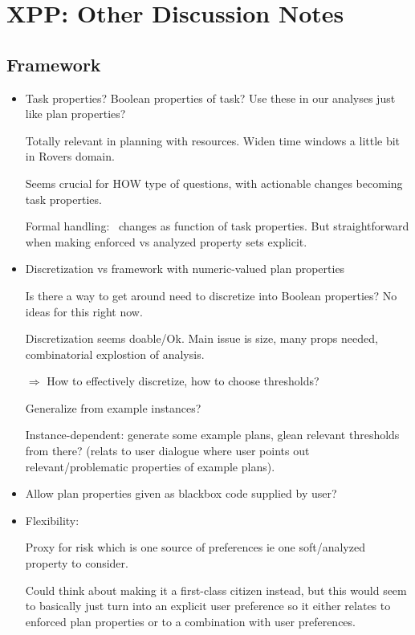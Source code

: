 \section{XPP: Other Discussion Notes}
\label{xpp-discussion}





\subsection{Framework}

\begin{itemize}
\item Task properties? Boolean properties of task? Use these in our
  analyses just like plan properties?

  Totally relevant in planning with resources. Widen time windows a
  little bit in Rovers domain. 

  Seems crucial for HOW type of questions, with actionable changes
  becoming task properties.

  Formal handling: \plans\ changes as function of task properties. But
  straightforward when making enforced vs analyzed property sets
  explicit.

\item Discretization vs framework with numeric-valued plan properties

  Is there a way to get around need to discretize into Boolean
  properties? No ideas for this right now. 

  Discretization seems doable/Ok. Main issue is size, many props
  needed, combinatorial explostion of analysis. 

  $\Rightarrow$ How to effectively discretize, how to choose
  thresholds?

  Generalize from example instances?

  Instance-dependent: generate some example plans, glean relevant
  thresholds from there? (relats to user dialogue where user points
  out relevant/problematic properties of example plans).

\item Allow plan properties given as blackbox code supplied by user?

\item Flexibility: 

  Proxy for risk which is one source of preferences ie one
  soft/analyzed property to consider.

  Could think about making it a first-class citizen instead, but this
  would seem to basically just turn into an explicit user preference
  so it either relates to enforced plan properties or to a combination
  with user preferences.


\end{itemize}
